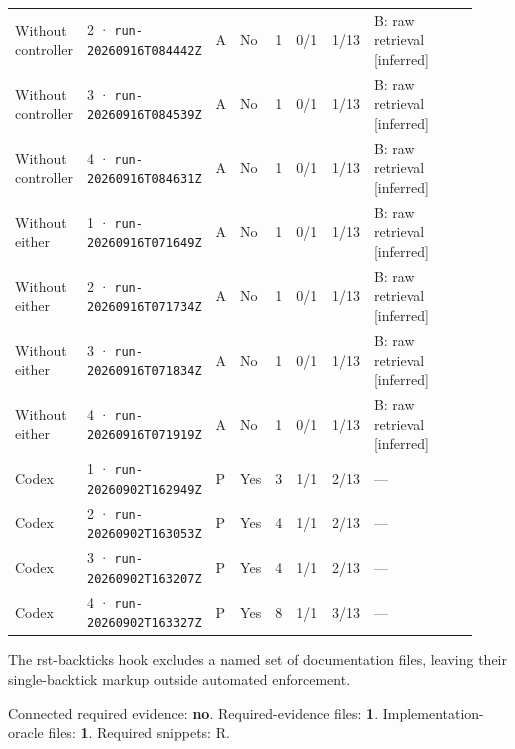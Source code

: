 \begin{landscape}
\begin{longtable}{@{}L{0.11\linewidth}L{0.16\linewidth}*{1}{L{0.022\linewidth}}L{0.05\linewidth}L{0.045\linewidth}L{0.08\linewidth}L{0.085\linewidth}L{0.368\linewidth}@{}}
Without controller & 2 · \texttt{run-20260916\allowbreak T084442Z} & A & No & 1 & 0/1 & 1/13 & B: raw retrieval [inferred] \\
Without controller & 3 · \texttt{run-20260916\allowbreak T084539Z} & A & No & 1 & 0/1 & 1/13 & B: raw retrieval [inferred] \\
Without controller & 4 · \texttt{run-20260916\allowbreak T084631Z} & A & No & 1 & 0/1 & 1/13 & B: raw retrieval [inferred] \\
Without either & 1 · \texttt{run-20260916\allowbreak T071649Z} & A & No & 1 & 0/1 & 1/13 & B: raw retrieval [inferred] \\
Without either & 2 · \texttt{run-20260916\allowbreak T071734Z} & A & No & 1 & 0/1 & 1/13 & B: raw retrieval [inferred] \\
Without either & 3 · \texttt{run-20260916\allowbreak T071834Z} & A & No & 1 & 0/1 & 1/13 & B: raw retrieval [inferred] \\
Without either & 4 · \texttt{run-20260916\allowbreak T071919Z} & A & No & 1 & 0/1 & 1/13 & B: raw retrieval [inferred] \\
Codex & 1 · \texttt{run-20260902\allowbreak T162949Z} & P & Yes & 3 & 1/1 & 2/13 & --- \\
Codex & 2 · \texttt{run-20260902\allowbreak T163053Z} & P & Yes & 4 & 1/1 & 2/13 & --- \\
Codex & 3 · \texttt{run-20260902\allowbreak T163207Z} & P & Yes & 4 & 1/1 & 2/13 & --- \\
Codex & 4 · \texttt{run-20260902\allowbreak T163327Z} & P & Yes & 8 & 1/1 & 3/13 & --- \\
\end{longtable}
\endgroup
\end{landscape}

\label{sec:pandas-dev-pandas-36617}

The rst-backticks hook excludes a named set of documentation files, leaving their single-backtick markup outside automated enforcement.

Connected required evidence: \textbf{no}. Required-evidence files: \textbf{1}. Implementation-oracle files: \textbf{1}. Required snippets: R.

